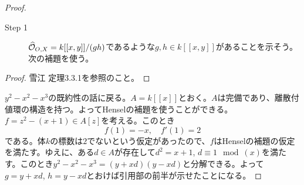 \begin{proof} ${}$
  \begin{description}
    \item[Step 1] $\widehat{\mathcal{O}}_{O,X} = k[[x,y]]/(gh)$であるような$g,h \in k[[x,y]]$があることを示そう。次の補題を使う。
  \end{description}
  \begin{proof}
    雪江\cite{雪江3} 定理3.3.1を参照のこと。
  \end{proof}
$y^2 - x^2 - x^3$の既約性の話に戻る。$A = k[[x]]$とおく。$A$は完備であり、離散付値環の構造を持つ。よってHenselの補題を使うことができる。$f= z^2 - (x+1) \in A[z]$を考える。このとき
\[
f(1 ) = -x, \quad f'(1) = 2
\]
である。体$k$の標数は$2$でないという仮定があったので、$f$はHenselの補題の仮定を満たす。ゆえに、ある$d \in A$が存在して$d^2=x+1$, $d \equiv 1 \mod (x)$を満たす。このとき$y^2 - x^2 - x^3 = (y + xd)(y - xd)$と分解できる。よって$g= y + xd$, $h = y - xd$とおけば引用部の前半が示せたことになる。


\end{proof}
